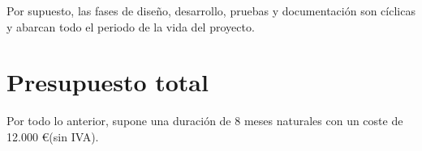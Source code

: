 Por supuesto, las fases de diseño, desarrollo, pruebas y documentación
son cíclicas y abarcan todo el periodo de la vida del proyecto.


\section{Presupuesto total}

Por todo lo anterior, supone una duración de 8 meses naturales con un coste de 12.000 \euro (sin IVA).

